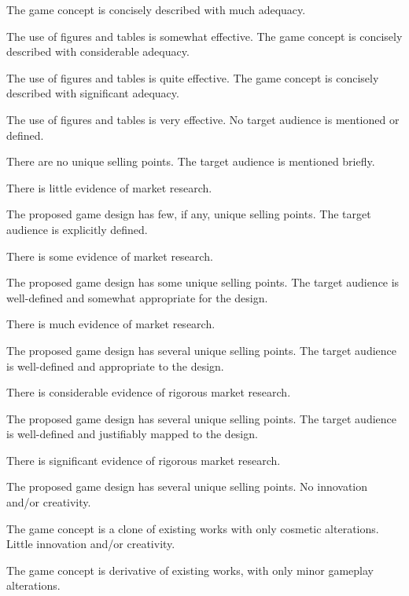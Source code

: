 \documentclass{../../fal_assignment}
\begin{document}
\begin{markingrubric}
        \grade The game concept is concisely described with much adequacy.
            \par The use of figures and tables is somewhat effective.
        \grade The game concept is concisely described with considerable adequacy.
            \par The use of figures and tables is quite effective.
        \grade The game concept is concisely described with significant adequacy.
            \par The use of figures and tables is very effective.
%
        \grade\fail No target audience is mentioned or defined.
            \par There are no unique selling points.
        \grade The target audience is mentioned briefly.
            \par There is little evidence of market research.
            \par The proposed game design has few, if any, unique selling points.
        \grade The target audience is explicitly defined.
            \par There is some evidence of market research.
            \par The proposed game design has some unique selling points.
        \grade The target audience is well-defined and somewhat appropriate for the design.
            \par There is much evidence of market research.
            \par The proposed game design has several unique selling points.
        \grade The target audience is well-defined and appropriate to the design.
            \par There is considerable evidence of rigorous market research.
            \par The proposed game design has several unique selling points.
        \grade The target audience is well-defined and justifiably mapped to the design.
            \par There is significant evidence of rigorous market research.
            \par The proposed game design has several unique selling points.
%
        \grade\fail No innovation and/or creativity.
            \par The game concept is a clone of existing works with only cosmetic alterations.
        \grade Little innovation and/or creativity.
            \par The game concept is derivative of existing works, with only minor gameplay alterations.

\end{markingrubric}
\end{document}
